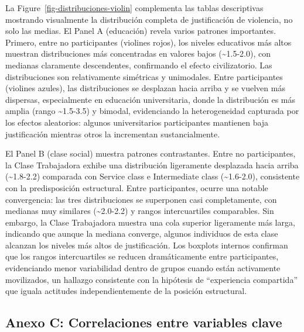 \documentclass[
  13pt,
]{article}
\begin{document}
La Figure~\ref{fig-distribuciones-violin} complementa las tablas
descriptivas mostrando visualmente la distribución completa de
justificación de violencia, no solo las medias. El Panel A (educación)
revela varios patrones importantes. Primero, entre no participantes
(violines rojos), los niveles educativos más altos muestran
distribuciones más concentradas en valores bajos
(\textasciitilde1.5-2.0), con medianas claramente descendentes,
confirmando el efecto civilizatorio. Las distribuciones son
relativamente simétricas y unimodales. Entre participantes (violines
azules), las distribuciones se desplazan hacia arriba y se vuelven más
dispersas, especialmente en educación universitaria, donde la
distribución es más amplia (rango \textasciitilde1.5-3.5) y bimodal,
evidenciando la heterogeneidad capturada por los efectos aleatorios:
algunos universitarios participantes mantienen baja justificación
mientras otros la incrementan sustancialmente.

El Panel B (clase social) muestra patrones contrastantes. Entre no
participantes, la Clase Trabajadora exhibe una distribución ligeramente
desplazada hacia arriba (\textasciitilde1.8-2.2) comparada con Service
class e Intermediate class (\textasciitilde1.6-2.0), consistente con la
predisposición estructural. Entre participantes, ocurre una notable
convergencia: las tres distribuciones se superponen casi completamente,
con medianas muy similares (\textasciitilde2.0-2.2) y rangos
intercuartiles comparables. Sin embargo, la Clase Trabajadora muestra
una cola superior ligeramente más larga, indicando que aunque la mediana
converge, algunos individuos de esta clase alcanzan los niveles más
altos de justificación. Los boxplots internos confirman que los rangos
intercuartiles se reducen dramáticamente entre participantes,
evidenciando menor variabilidad dentro de grupos cuando están
activamente movilizados, un hallazgo consistente con la hipótesis de
``experiencia compartida'' que iguala actitudes independientemente de la
posición estructural.

\subsection{Anexo C: Correlaciones entre variables
clave}\label{anexo-c-correlaciones-entre-variables-clave}

\begingroup\fontsize{9}{11}\selectfont
\end{document}
